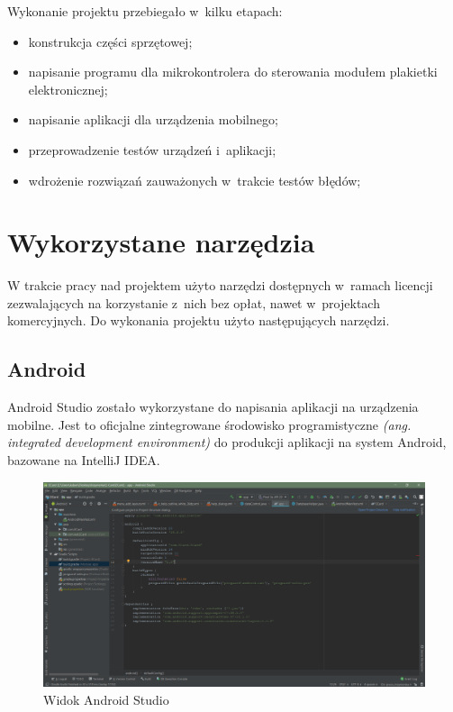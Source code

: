 \documentclass[a4paper,12pt, twoside]{article}
\begin{document}
    	\begin{flushleft}
    	Wykonanie projektu przebiegało w~kilku etapach:
    	\begin{itemize}
    	    \item konstrukcja części sprzętowej;
    	    \item napisanie programu dla mikrokontrolera do sterowania modułem plakietki elektronicznej;
    	    \item napisanie aplikacji dla urządzenia mobilnego;
    	    \item przeprowadzenie testów urządzeń i~aplikacji;
    	    \item wdrożenie rozwiązań zauważonych w~trakcie testów błędów;
    	\end{itemize}
    	\end{flushleft}
 
        \newpage
    	\section{Wykorzystane narzędzia}
    	W trakcie pracy nad projektem użyto narzędzi dostępnych w~ramach licencji zezwalających na korzystanie z~nich bez opłat, nawet w~projektach komercyjnych. Do wykonania projektu użyto następujących narzędzi.
    	
    	\subsection{Android}
    	Android Studio zostało wykorzystane do napisania aplikacji na urządzenia mobilne. Jest to oficjalne zintegrowane środowisko programistyczne \textit{(ang. integrated development environment)} \cite{ide} do produkcji aplikacji na system Android, bazowane na IntelliJ IDEA.
    	
    	\begin{figure}[H]
    	    \centering
    		\includegraphics[width=1\textwidth]{images/rys4_android.png}
    		\caption{Widok Android Studio}
            \label{fig:androidstudio}
    	\end{figure}
     	
\end{document}
